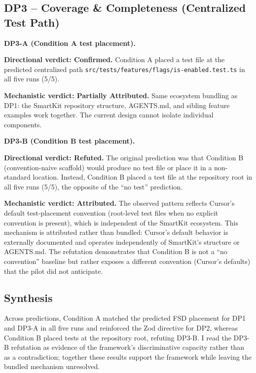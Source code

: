 \documentclass[12pt,a4paper]{report}
\DeclareRobustCommand{\filename}[1]{\bgroup\urlstyle{tt}\nolinkurl{#1}\egroup}
\begin{document}
\subsection{DP3 -- Coverage \& Completeness (Centralized Test Path)}
\label{sec:dp3-results}

\textbf{DP3-A (Condition A test placement).}

\textbf{Directional verdict: Confirmed.} Condition A placed a test file at the predicted centralized path \filename{src/tests/features/flags/is-enabled.test.ts} in all five runs (5/5).

\textbf{Mechanistic verdict: Partially Attributed.} Same ecosystem bundling as DP1: the SmartKit repository structure, AGENTS.md, and sibling feature examples work together. The current design cannot isolate individual components.

\textbf{DP3-B (Condition B test placement).}

\textbf{Directional verdict: Refuted.} The original prediction was that Condition B (convention-naive scaffold) would produce no test file or place it in a non-standard location. Instead, Condition B placed a test file at the repository root in all five runs (5/5), the opposite of the ``no test'' prediction.

\textbf{Mechanistic verdict: Attributed.} The observed pattern reflects Cursor's default test-placement convention (root-level test files when no explicit convention is present), which is independent of the SmartKit ecosystem. This mechanism is attributed rather than bundled: Cursor's default behavior is externally documented and operates independently of SmartKit's structure or AGENTS.md. The refutation demonstrates that Condition B is not a ``no convention'' baseline but rather exposes a different convention (Cursor's defaults) that the pilot did not anticipate.

\subsection{Synthesis}
\label{sec:discussion-synthesis}

Across predictions, Condition A matched the predicted FSD placement for DP1 and DP3-A in all five runs and reinforced the Zod directive for DP2, whereas Condition B placed tests at the repository root, refuting DP3-B. I read the DP3-B refutation as evidence of the framework's discriminative capacity rather than as a contradiction; together these results support the framework while leaving the bundled mechanism unresolved.
\end{document}
